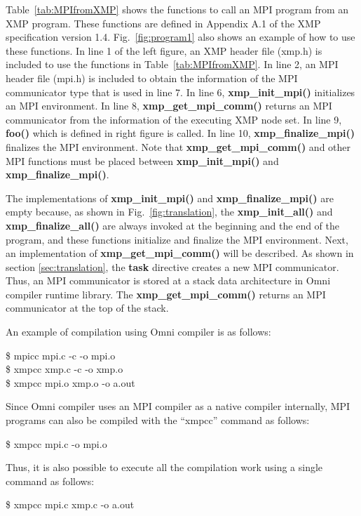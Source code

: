 \documentclass[graybox]{svmult}
\begin{document}
Table~\ref{tab:MPIfromXMP}  shows  the functions to call an MPI program from an XMP program.
These functions are defined in Appendix A.1 of the XMP specification version 1.4\cite{xmp-spec}.
Fig.~\ref{fig:program1} also shows an example of how to use these functions.
In line 1 of the left figure, an XMP header file (xmp.h) is included to use the functions in Table~\ref{tab:MPIfromXMP}.
In line 2, an MPI header file (mpi.h) is included to obtain the information of the MPI communicator type that is used in line 7.
In line 6,  {\bf xmp\_init\_mpi()} initializes an MPI environment.
In line 8,  {\bf xmp\_get\_mpi\_comm()}  returns an MPI communicator from the information of the executing XMP node set.
In line 9,  {\bf foo()}  which is defined in right figure is called.
In line 10,  {\bf xmp\_finalize\_mpi()}  finalizes the MPI environment.
Note that  {\bf xmp\_get\_mpi\_comm()}  and other MPI functions must be placed between  {\bf xmp\_init\_mpi()} and {\bf xmp\_finalize\_mpi()}.

The implementations of  {\bf xmp\_init\_mpi()} and {\bf xmp\_finalize\_mpi()} are empty because,
as shown in Fig.~\ref{fig:translation},
the {\bf xmp\_init\_all()} and {\bf xmp\_finalize\_all()} are always invoked at the beginning and the end of the program, and these functions initialize and finalize the MPI environment.
Next, an implementation of {\bf xmp\_get\_mpi\_comm()} will be described. 
As shown in section \ref{sec:translation}, the \textbf{task} directive creates a new MPI communicator.
Thus, an MPI communicator is stored at a stack data architecture in Omni compiler runtime library. 
The {\bf xmp\_get\_mpi\_comm()} returns an MPI communicator at the top of the stack.

An example of compilation using Omni compiler is as follows:
\begin{svgraybox}
\$ mpicc mpi.c -c -o mpi.o\\
\$ xmpcc xmp.c -c -o xmp.o \\
\$ xmpcc mpi.o xmp.o -o a.out
\end{svgraybox}

Since Omni compiler uses an MPI compiler as a native compiler internally, MPI programs can also be compiled with the ``xmpcc'' command as follows:
\begin{svgraybox}
\$ xmpcc mpi.c -o mpi.o
\end{svgraybox}

Thus, it is also possible to execute all the compilation work using a single command as follows:
\begin{svgraybox}
\$ xmpcc mpi.c xmp.c -o a.out
\end{svgraybox}
\end{document}
